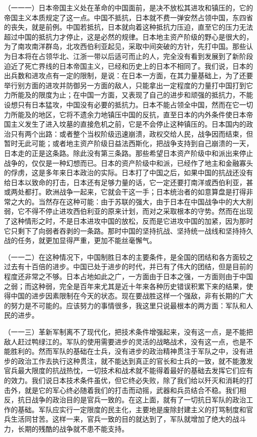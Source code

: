 （一一一）日本帝国主义处在革命的中国面前，是决不放松其进攻和镇压的，它的帝国主义本质规定了这一点。中国不抵抗，日本就不费一弹安然占领中国，东四省的丧失，就是前例。中国若抵抗，日本就向着这种抵抗力压迫，直至它的压力无法超过中国的抵抗力才停止，这是必然的规律。日本地主资产阶级的野心是很大的，为了南攻南洋群岛，北攻西伯利亚起见，采取中间突破的方针，先打中国。那些认为日本将在占领华北、江浙一带以后适可而止的人，完全没有看到发展到了新阶段迫近了死亡界线的日本帝国主义，已经和历史上的日本不相同了。我们说，日本的出兵数和进攻点有一定的限制，是说：在日本一方面，在其力量基础上，为了还要举行别方面的进攻并防御另一方面的敌人，只能拿出一定程度的力量打中国打到它力所能及的限度为止；在中国一方面，又表现了自己的进步和顽强的抵抗力，不能设想只有日本猛攻，中国没有必要的抵抗力。日本不能占领全中国，然而在它一切力所能及的地区，它将不遗余力地镇压中国的反抗，直至日本的内外条件使日本帝国主义发生了进入坟墓的直接危机之前，它是不会停止这种镇压的。日本国内的政治只有两个出路：或者整个当权阶级迅速崩溃，政权交给人民，战争因而结束，但暂时无此可能；或者地主资产阶级日益法西斯化，把战争支持到自己崩溃的一天，日本走的正是这条路。除此没有第三条路。那些希望日本资产阶级中和派出来停止战争的，仅仅是一种幻想而已。日本的资产阶级中和派，已经作了地主和金融寡头的俘虏，这是多年来日本政治的实际。日本打了中国之后，如果中国的抗战还没有给日本以致命的打击，日本还有足够力量的话，它一定还要打南洋或西伯利亚，甚或两处都打。欧洲战争一起来，它就会干这一手；日本统治者的如意算盘是打得非常之大的。当然存在这种可能：由于苏联的强大，由于日本在中国战争中的大大削弱，它不得不停止进攻西伯利亚的原来计划，而对之采取根本的守势。然而在出现了这种情形之时，不是日本进攻中国的放松，反而是它进攻中国的加紧，因为那时它只剩下了向弱者吞剥的一条路。那时中国的坚持抗战、坚持统一战线和坚持持久战的任务，就更加显得严重，更加不能丝毫懈气。

（一一二）在这种情况下，中国制胜日本的主要条件，是全国的团结和各方面较之过去有十百倍的进步。中国已处于进步的时代，并已有了伟大的团结，但是目前的程度还非常之不够。日本占地如此之广，一方面由于日本之强，一方面则由于中国之弱；而这种弱，完全是百年来尤其是近十年来各种历史错误积累下来的结果，使得中国的进步因素限制在今天的状态。现在要战胜这样一个强敌，非有长期的广大的努力是不可能的。应该努力的事情很多，我这里只说最根本的两方面：军队和人民的进步。

（一一三）革新军制离不了现代化，把技术条件增强起来，没有这一点，是不能把敌人赶过鸭绿江的。军队的使用需要进步的灵活的战略战术，没有这一点，也是不能胜利的。然而军队的基础在士兵，没有进步的政治精神贯注于军队之中，没有进步的政治工作去执行这种贯注，就不能达到真正的官长和士兵的一致，就不能激发官兵最大限度的抗战热忱，一切技术和战术就不能得着最好的基础去发挥它们应有的效力。我们说日本技术条件虽优，但它终必失败，除了我们给以歼灭和消耗的打击外，就是它的军心终必随着我们的打击而动摇，武器和兵员结合不稳。我们相反，抗日战争的政治目的是官兵一致的。在这上面，就有了一切抗日军队的政治工作的基础。军队应实行一定限度的民主化，主要地是废除封建主义的打骂制度和官兵生活同甘苦。这样一来，官兵一致的目的就达到了，军队就增加了绝大的战斗力，长期的残酷的战争就不患不能支持。

